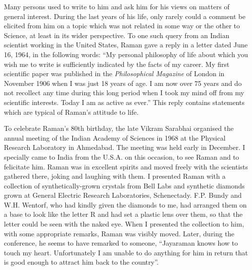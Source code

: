 Many persons used to write to him and ask him for his views
on matters of general interest. During the last years of his life,
only rarely could a comment be elicited from him on a topic which
was not related in some way or the other to Science, at least in
its wider perspective. To one such query from an Indian scientist
working in the United States, Raman gave a reply in a letter dated
June 16, 1964, in the following words: ``My personal philosophy
of life about which you wish me to write is sufficiently indicated
by the facts of my career. My first scientific paper was published
in the {\em Philosophical Magazine} of London in November 1906 when
I was just 18 years of age. I am now over 75 years and do not
recollect any time during this long period when I took my mind
off from my scientific interests. Today I am as active as ever.''
This reply contains statements which are typical of Raman's
attitude to life.

To celebrate Raman's 80th birthday, the late Vikram
Sarabhai organised the annual meeting of the Indian Academy
of Sciences in 1968 at the Physical Research Laboratory in
Ahmedabad. The meeting was held early in December. I specially
came to India from the U.S.A. on this occasion, to see Raman
and to felicitate him. Raman was in excellent spirits and moved
freely with the scientists gathered there, joking and laughing with
them. I presented Raman with a collection of synthetically-grown
crystals from Bell Labs and synthetic diamonds grown at General
Electric Research Laboratories, Schenectady. F.P. Bundy and
W.H. Wentorf, who had kindly given the diamonds to me, had
arranged them on a base to look like the letter R and had set
a plastic lens over them, so that the letter could be seen with the
naked eye. When I presented the collection to him, with some
appropriate remarks, Raman was visibly moved. Later, during
the conference, he seems to have remarked to someone,
``Jayaraman knows how to touch my heart. Unfortunately I am
unable to do anything for him in return that is good enough to
attract him back to the country''.


